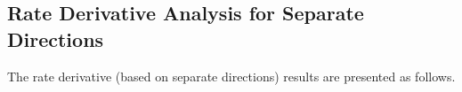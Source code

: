 \subsection{Rate Derivative Analysis for Separate Directions}

The rate derivative (based on separate directions) results are presented as follows.

